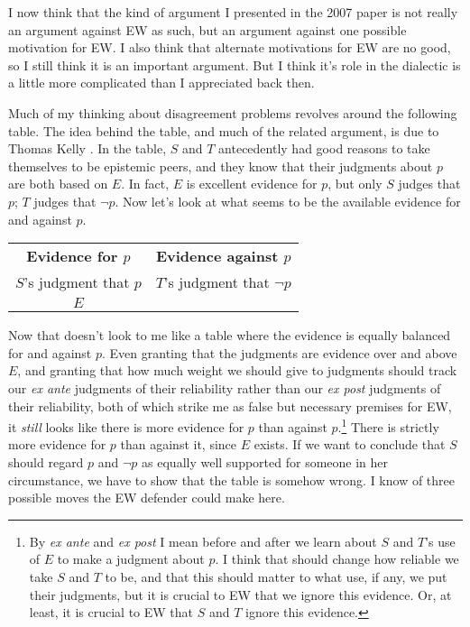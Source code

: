 \noindent I now think that the kind of argument I presented in the 2007 paper is not really an argument against EW as such, but an argument against one possible motivation for EW. I also think that alternate motivations for EW are no good, so I still think it is an important argument. But I think it's role in the dialectic is a little more complicated than I appreciated back then.

Much of my thinking about disagreement problems revolves around the following table. The idea behind the table, and much of the related argument, is due to Thomas Kelly \citeyearpar{Kelly2010-KELPDA}. In the table, $S$ and $T$ antecedently had good reasons to take themselves to be epistemic peers, and they know that their judgments about $p$ are both based on $E$. In fact, $E$ is excellent evidence for $p$, but only $S$ judges that $p$; $T$ judges that $\neg p$. Now let's look at what seems to be the available evidence for and against $p$.

\begin{center}
\begin{tabular}{c c}
\textbf{Evidence for $p$} & \textbf{Evidence against $p$} \\
$S$'s judgment that $p$ & $T$'s judgment that $\neg p$ \\
$E$ & \\
\end{tabular}
\end{center}

\noindent Now that doesn't look to me like a table where the evidence is equally balanced for and against $p$. Even granting that the judgments are evidence over and above $E$, and granting that how much weight we should give to judgments should track our \textit{ex ante} judgments of their reliability rather than our \textit{ex post} judgments of their reliability, both of which strike me as false but necessary premises for EW, it \textit{still} looks like there is more evidence for $p$ than against $p$.\footnote{By \textit{ex ante} and \textit{ex post} I mean before and after we learn about $S$ and $T$'s use of $E$ to make a judgment about $p$. I think that should change how reliable we take $S$ and $T$ to be, and that this should matter to what use, if any, we put their judgments, but it is crucial to EW that we ignore this evidence. Or, at least, it is crucial to EW that $S$ and $T$ ignore this evidence.} There is strictly more evidence for $p$ than against it, since $E$ exists. If we want to conclude that $S$ should regard $p$ and $\neg p$ as equally well supported for someone in her circumstance, we have to show that the table is somehow wrong. I know of three possible moves the EW defender could make here.

